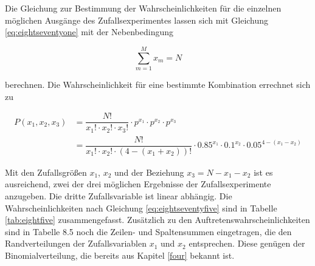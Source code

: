 \noindent Die Gleichung zur Bestimmung der Wahrscheinlichkeiten f\"{u}r die einzelnen m\"{o}glichen Ausg\"{a}nge des Zufallsexperimentes lassen sich mit Gleichung \eqref{eq:eightseventyone} mit der Nebenbedingung

\begin{equation}\label{eq:eightseventyfour}
\sum _{m=1}^{M}x_{m} =N
\end{equation}

\noindent berechnen. Die Wahrscheinlichkeit f\"{u}r eine bestimmte Kombination errechnet sich zu

\begin{equation}\label{eq:eightseventyfive}
\begin{split}
P(x_{1} ,x_{2} ,x_{3}) & = \dfrac{N!}{x_{1} !\cdot x_{2} !\cdot x_{3} !} \cdot p^{x_{1}} \cdot p^{x_{2}} \cdot p^{x_{3}}\\
& = \dfrac{N!}{x_{1} !\cdot x_{2} !\cdot (4-(x_{1}+x_{2}))!} \cdot 0.85^{x_{1}} \cdot 0.1^{x_{2}} \cdot 0.05^{4-(x_{1}-x_{2})}
\end{split}
\end{equation}

\clearpage

\noindent Mit den Zufallsgr\"{o}{\ss}en $x_{1}$, $x_{2}$ und der Beziehung $x_{3} = N - x_{1} - x_{2}$ ist es ausreichend, zwei der drei m\"{o}glichen Ergebnisse der Zufallsexperimente anzugeben. Die dritte Zufallsvariable ist linear abh\"{a}ngig. Die Wahrscheinlichkeiten nach Gleichung \eqref{eq:eightseventyfive} sind in Tabelle \ref{tab:eightfive} zusammengefasst. Zus\"{a}tzlich zu den Auftretenswahrscheinlichkeiten sind in Tabelle 8.5 noch die Zeilen- und Spaltensummen eingetragen, die den Randverteilungen der Zufallsvariablen $x_{1}$ und $x_{2}$ entsprechen. Diese gen\"{u}gen der Binomialverteilung, die bereits aus Kapitel \ref{four} bekannt ist.

